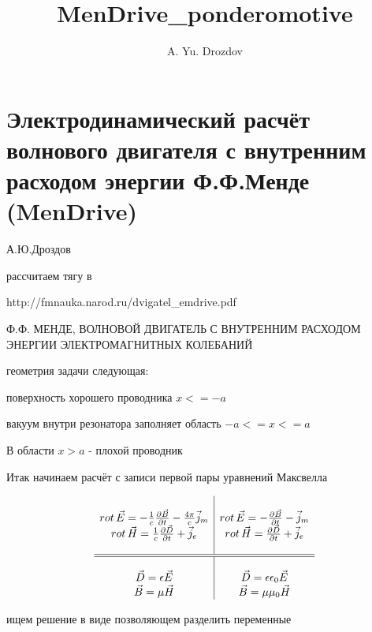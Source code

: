 \documentclass[11pt]{article}
\author{A. Yu. Drozdov}
\title{MenDrive\_ponderomotive}
\begin{document}
    \maketitle


    \section{Электродинамический расчёт волнового двигателя с внутренним
расходом энергии Ф.Ф.Менде
(MenDrive)}\label{ux44dux43bux435ux43aux442ux440ux43eux434ux438ux43dux430ux43cux438ux447ux435ux441ux43aux438ux439-ux440ux430ux441ux447ux451ux442-ux432ux43eux43bux43dux43eux432ux43eux433ux43e-ux434ux432ux438ux433ux430ux442ux435ux43bux44f-ux441-ux432ux43dux443ux442ux440ux435ux43dux43dux438ux43c-ux440ux430ux441ux445ux43eux434ux43eux43c-ux44dux43dux435ux440ux433ux438ux438-ux444.ux444.ux43cux435ux43dux434ux435-mendrive}

А.Ю.Дроздов

    рассчитаем тягу в

http://fmnauka.narod.ru/dvigatel\_emdrive.pdf

Ф.Ф. МЕНДЕ, ВОЛНОВОЙ ДВИГАТЕЛЬ С ВНУТРЕННИМ РАСХОДОМ ЭНЕРГИИ
ЭЛЕКТРОМАГНИТНЫХ КОЛЕБАНИЙ

    геометрия задачи следующая:

поверхность хорошего проводника \(x<=-a\)

вакуум внутри резонатора заполняет область \(-a<=x<=a\)

В области \(x>a\) - плохой проводник

    Итак начинаем расчёт с записи первой пары уравнений Максвелла

    \[\begin{array}{c|c} \\
rot\,\vec{E} = -\frac{1}{c}\frac{\partial \vec B}{\partial t} - \frac{4\pi}{c}\vec j_m&
rot\,\vec{E} = -\frac{\partial \vec B}{\partial t} - \vec j_m \\
rot\,\vec{H} = \frac{1}{c}\frac{\partial \vec D}{\partial t} + \vec j_e &
rot\,\vec{H} = \frac{\partial \vec D}{\partial t} + \vec j_e \\
\\ \hline
\hline \\
\vec{D} = \epsilon \vec{E}&
\vec{D} = \epsilon \epsilon_0 \vec{E} \\
\vec {B} = \mu \vec{H} &
\vec {B} = \mu \mu_0 \vec{H} \\
\end{array}\]

    ищем решение в виде позволяющем разделить переменные
\end{document}
